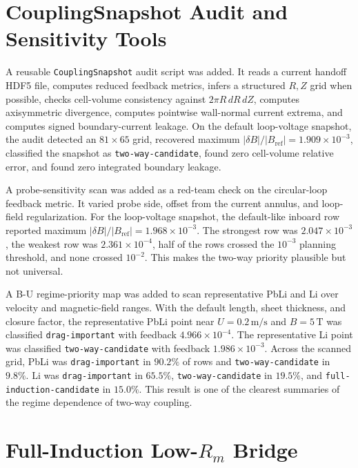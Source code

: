 \documentclass[11pt]{article}
\begin{document}
\section{CouplingSnapshot Audit and Sensitivity Tools}

A reusable \texttt{CouplingSnapshot} audit script was added. It reads a current handoff HDF5 file, computes reduced feedback metrics, infers a structured \(R,Z\) grid when possible, checks cell-volume consistency against \(2\pi R\,dR\,dZ\), computes axisymmetric divergence, computes pointwise wall-normal current extrema, and computes signed boundary-current leakage. On the default loop-voltage snapshot, the audit detected an \(81\times 65\) grid, recovered maximum \(|\delta B|/|B_{\mathrm{ref}}|=1.909\times 10^{-3}\), classified the snapshot as \texttt{two-way-candidate}, found zero cell-volume relative error, and found zero integrated boundary leakage.

A probe-sensitivity scan was added as a red-team check on the circular-loop feedback metric. It varied probe side, offset from the current annulus, and loop-field regularization. For the loop-voltage snapshot, the default-like inboard row reported maximum \(|\delta B|/|B_{\mathrm{ref}}|=1.968\times 10^{-3}\). The strongest row was \(2.047\times 10^{-3}\), the weakest row was \(2.361\times 10^{-4}\), half of the rows crossed the \(10^{-3}\) planning threshold, and none crossed \(10^{-2}\). This makes the two-way priority plausible but not universal.

A B-U regime-priority map was added to scan representative PbLi and Li over velocity and magnetic-field ranges. With the default length, sheet thickness, and closure factor, the representative PbLi point near \(U=0.2\,\mathrm{m/s}\) and \(B=5\,\mathrm{T}\) was classified \texttt{drag-important} with feedback \(4.966\times 10^{-4}\). The representative Li point was classified \texttt{two-way-candidate} with feedback \(1.986\times 10^{-3}\). Across the scanned grid, PbLi was \texttt{drag-important} in \(90.2\%\) of rows and \texttt{two-way-candidate} in \(9.8\%\). Li was \texttt{drag-important} in \(65.5\%\), \texttt{two-way-candidate} in \(19.5\%\), and \texttt{full-induction-candidate} in \(15.0\%\). This result is one of the clearest summaries of the regime dependence of two-way coupling.

\section{Full-Induction Low-\(R_m\) Bridge}
\end{document}

